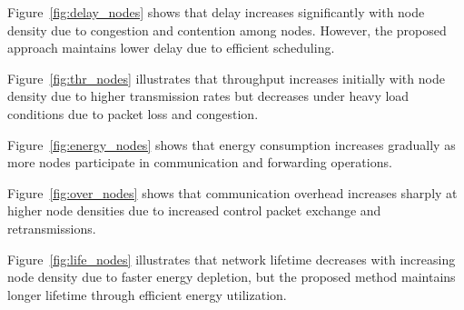 \documentclass[a4paper,fleqn]{cas-dc}
\numberwithin{equation}{section}
\begin{document}
\begin{center}

\label{fig:delay_nodes}
\end{center}

Figure~\ref{fig:delay_nodes} shows that delay increases significantly with node density due to congestion and contention among nodes. However, the proposed approach maintains lower delay due to efficient scheduling.

\vspace{0.3cm}


\begin{center}

\label{fig:thr_nodes}
\end{center}

Figure~\ref{fig:thr_nodes} illustrates that throughput increases initially with node density due to higher transmission rates but decreases under heavy load conditions due to packet loss and congestion.

\vspace{0.3cm}


\begin{center}

\label{fig:energy_nodes}
\end{center}

Figure~\ref{fig:energy_nodes} shows that energy consumption increases gradually as more nodes participate in communication and forwarding operations.

\vspace{0.3cm}

\begin{center}

\label{fig:over_nodes}
\end{center}

Figure~\ref{fig:over_nodes} shows that communication overhead increases sharply at higher node densities due to increased control packet exchange and retransmissions.

\vspace{0.3cm}


\begin{center}

\label{fig:life_nodes}
\end{center}

Figure~\ref{fig:life_nodes} illustrates that network lifetime decreases with increasing node density due to faster energy depletion, but the proposed method maintains longer lifetime through efficient energy utilization.
\end{document}
